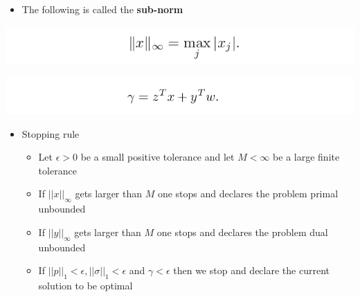 \documentclass[11pt]{article}
\begin{document}
\begin{itemize}
\item The following is called the \textbf{sub-norm}
\end{itemize}
\begin{center}
\includegraphics[width=.9\linewidth]{A Path-Following Method/screenshot_2019-03-11_17-13-44.png}
\end{center}


\begin{center}
\includegraphics[width=.9\linewidth]{A Path-Following Method/screenshot_2019-03-11_17-14-09.png}
\end{center} 

\begin{itemize}
\item Stopping rule
\begin{itemize}
\item Let \(\epsilon > 0\) be a small positive tolerance and let \(M < \infty\) be a large finite tolerance
\item If \(||x||_\infty\) gets larger than \(M\) one stops and declares the problem primal unbounded
\item If \(||y||_\infty\) gets larger than \(M\) one stops and declares the problem dual unbounded
\item If \(||p||_1 < \epsilon, ||\sigma||_1 < \epsilon\) and \(\gamma < \epsilon\) then we stop and declare the current solution to be optimal
\end{itemize}
\end{itemize}
\end{document}
